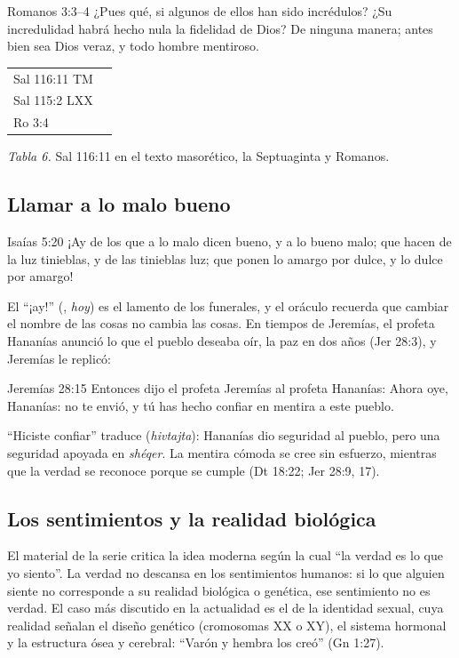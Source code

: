 \begin{verso}{Romanos 3:3–4}
¿Pues qué, si algunos de ellos han sido incrédulos? ¿Su incredulidad habrá hecho nula la fidelidad de Dios? De ninguna manera; antes bien sea Dios veraz, y todo hombre mentiroso.
\end{verso}

\begin{center}\small\renewcommand{\arraystretch}{1.2}
\begin{tabular}{@{}L{2.6cm}L{11.8cm}@{}}
\toprule
Sal 116:11 TM &  \\
Sal 115:2 LXX &  \\
Ro 3:4 &  \\
\bottomrule
\end{tabular}\par
{\footnotesize\color{gris}\textit{Tabla 6.} Sal 116:11 en el texto masorético, la Septuaginta y Romanos.}
\end{center}

\subsection{Llamar a lo malo bueno}
\begin{verso}{Isaías 5:20}
¡Ay de los que a lo malo dicen bueno, y a lo bueno malo; que hacen de la luz tinieblas, y de las tinieblas luz; que ponen lo amargo por dulce, y lo dulce por amargo!
\end{verso}

El ``¡ay!'' (, \emph{hoy}) es el lamento de los funerales, y el oráculo recuerda que cambiar el nombre de las cosas no cambia las cosas. En tiempos de Jeremías, el profeta Hananías anunció lo que el pueblo deseaba oír, la paz en dos años (Jer 28:3), y Jeremías le replicó:

\begin{verso}{Jeremías 28:15}
Entonces dijo el profeta Jeremías al profeta Hananías: Ahora oye, Hananías: \SENOR{} no te envió, y tú has hecho confiar en mentira a este pueblo.
\end{verso}

``Hiciste confiar'' traduce  (\emph{hivtajta}): Hananías dio seguridad al pueblo, pero una seguridad apoyada en \emph{shéqer}. La mentira cómoda se cree sin esfuerzo, mientras que la verdad se reconoce porque se cumple (Dt 18:22; Jer 28:9, 17).

\subsection{Los sentimientos y la realidad biológica}
El material de la serie critica la idea moderna según la cual ``la verdad es lo que yo siento''. La verdad no descansa en los sentimientos humanos: si lo que alguien siente no corresponde a su realidad biológica o genética, ese sentimiento no es verdad. El caso más discutido en la actualidad es el de la identidad sexual, cuya realidad señalan el diseño genético (cromosomas XX o XY), el sistema hormonal y la estructura ósea y cerebral: ``Varón y hembra los creó'' (Gn 1:27).

